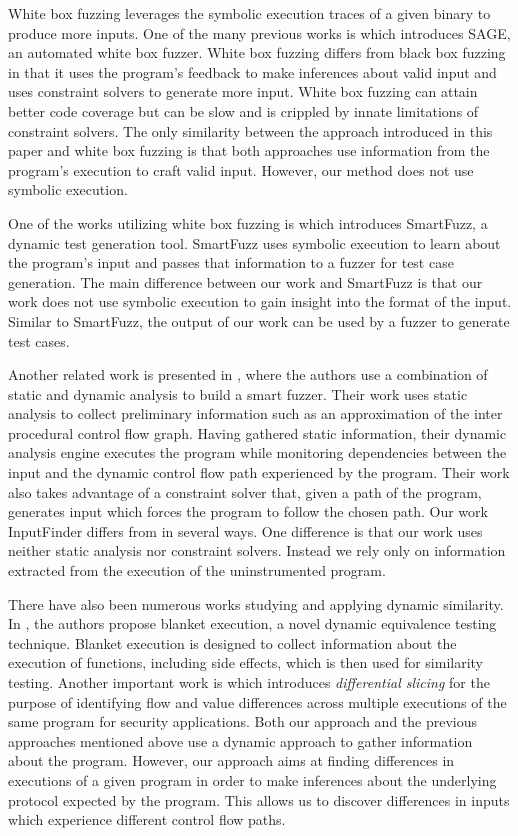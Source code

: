 \documentclass{acm_proc_article-sp}
\def \tool {InputFinder}
\begin{document}
White box fuzzing leverages the symbolic execution traces of a given binary to produce more inputs.
One of the many previous works is \cite{godefroid2008automated} which introduces SAGE, an automated white box fuzzer.
White box fuzzing differs from black box fuzzing in that it uses the program's feedback to make inferences about valid input and uses constraint solvers to generate more input.
White box fuzzing can attain better code coverage but can be slow and is crippled by innate limitations of constraint solvers.
The only similarity between the approach introduced in this paper and white box fuzzing is that both approaches use information from the program's execution to craft valid input.
However, our method does not use symbolic execution.

One of the works utilizing white box fuzzing is \cite{molnar2009dynamic} which introduces SmartFuzz, a dynamic test generation tool.
SmartFuzz uses symbolic execution to learn about the program's input and passes that information to a fuzzer for test case generation.
The main difference between our work and SmartFuzz is that our work does not use symbolic execution to gain insight into the format of the input.
Similar to SmartFuzz, the output of our work can be used by a fuzzer to generate test cases.

Another related work is presented in \cite{smartfuzzer}, where the authors use a combination of static and dynamic analysis to build a smart fuzzer.
Their work uses static analysis to collect preliminary information such as an approximation of the inter procedural control flow graph.
Having gathered static information, their dynamic analysis engine executes the program while monitoring dependencies between the input and the dynamic control flow path experienced by the program.
Their work also takes advantage of a constraint solver that, given a path of the program, generates input which forces the program to follow the chosen path.
Our work \tool{} differs from \cite{smartfuzzer} in several ways.
One difference is that our work uses neither static analysis nor constraint solvers.
Instead we rely only on information extracted from the execution of the uninstrumented program. 

There have also been numerous works studying and applying dynamic similarity.
In \cite{blanketexec}, the authors propose blanket execution, a novel dynamic equivalence testing technique.
Blanket execution is designed to collect information about the execution of functions, including side effects, which is then used for similarity testing.
Another important work is \cite{differential} which introduces \textit{differential slicing} for the purpose of identifying flow and value differences across multiple executions of the same program for security applications.
Both our approach and the previous approaches mentioned above use a dynamic approach to gather information about the program.
However, our approach aims at finding differences in executions of a given program in order to make inferences about the underlying protocol expected by the program.
This allows us to discover differences in inputs which experience different control flow paths.
\end{document}
